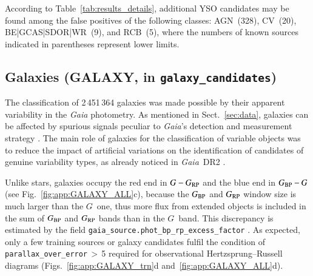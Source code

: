 \documentclass[longauth]{aa}
\def\gaia{\textit{Gaia}\xspace}
\def\g{$G$\xspace}
\def\bp{$G_{\rm BP}$\xspace}
\def\rp{$G_{\rm RP}$\xspace}
\def\bpg{\mbox{$G_{\rm BP}-G$}\xspace}
\def\grp{\mbox{$G-G_{\rm RP}$}\xspace}
\begin{document}
According to Table~\ref{tab:results_details}, additional YSO candidates may be found among the false positives of the following classes: AGN~(328), CV~(20),  BE|GCAS|SDOR|WR~(9), and RCB~(5), where the numbers of known sources indicated in parentheses represent lower limits.



\subsection{Galaxies (GALAXY, in \texttt{galaxy\_candidates})\label{ssec:galaxy}}

The classification of 2\,451\,364 galaxies was made possible by their apparent variability in the \gaia photometry.
As mentioned in Sect.~\ref{sec:data}, galaxies can be affected by spurious signals peculiar to \gaia's detection and measurement strategy \citep{DR3-DPACP-164}. 
The main role of galaxies for the classification of variable objects was to reduce the impact of artificial variations on the identification of candidates of genuine variability types, as already noticed in \gaia~DR2 \citep{2019A&A...622A..60C}.

Unlike stars, galaxies occupy the red end in \grp and the blue end in \bpg (see Fig.~\ref{fig:app:GALAXY_ALL}c), because the \bp and \rp window size is much larger than the \g~one, thus more flux from extended objects is included in the sum of \bp and \rp bands than in the \g~band. This discrepancy is estimated by the field \texttt{gaia\_source.phot\_bp\_rp\_excess\_factor} \citep{2021A&A...649A...3R}.
As expected, only a few training sources or galaxy candidates fulfil the condition of \texttt{parallax\_over\_error}\,$>$\,5 required for  observational Hertzsprung--Russell diagrams (Figs.~\ref{fig:app:GALAXY_trn}d and~\ref{fig:app:GALAXY_ALL}d).
\end{document}
